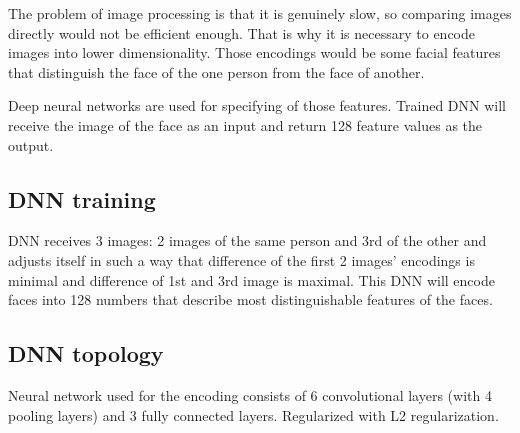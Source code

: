 \documentclass[hidelinks, english]{mvi-report}
\begin{document}
    The problem of image processing is that it is genuinely slow, so comparing images directly would not be efficient
    enough. That is why it is necessary to encode images into lower dimensionality. Those encodings would be some facial
    features that distinguish the face of the one person from the face of another.

    Deep neural networks are used for specifying of those features. Trained DNN will receive the image of the face as
    an input and return 128 feature values as the output.

    \subsection{DNN training}
    DNN receives 3 images: 2 images of the same person and 3rd of the other and adjusts itself in such a way that
    difference of the first 2 images' encodings is minimal and difference of 1st and 3rd image is maximal. This DNN will
    encode faces into 128 numbers that describe most distinguishable features of the faces.

    \subsection{DNN topology}

    Neural network used for the encoding consists of 6 convolutional layers (with 4 pooling layers) and 3 fully
    connected layers. Regularized with L2 regularization.
\end{document}
